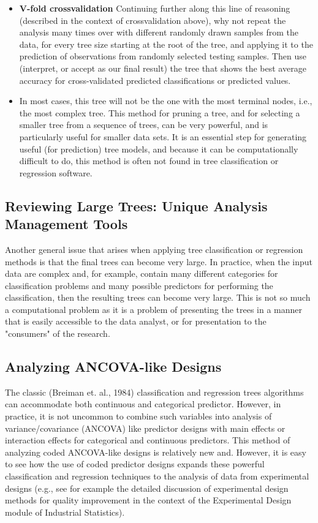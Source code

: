 \documentclass[caret-main.tex]{subfiles}
\begin{document}
\begin{itemize}
\item \textbf{V-fold crossvalidation} Continuing further along this line of reasoning (described in the context of crossvalidation above), why not repeat the analysis many times over with different randomly drawn samples from the data, for every tree size starting at the root of the tree, and applying it to the prediction of observations from randomly selected testing samples. Then use (interpret, or accept as our final result) the tree that shows the best average accuracy for cross-validated predicted classifications or predicted values.
\item In most cases, this tree will not be the one with the most terminal nodes, i.e., the most complex tree. This method for pruning a tree, and for selecting a smaller tree from a sequence of trees, can be very powerful, and is particularly useful for smaller data sets. It is an essential step for generating useful (for prediction) tree models, and because it can be computationally difficult to do, this method is often not found in tree classification or regression software.
\end{itemize}
\newpage
\subsection{Reviewing Large Trees: Unique Analysis Management Tools}

Another general issue that arises when applying tree classification or regression methods is that the final trees can become very large. In practice, when the input data are complex and, for example, contain many different categories for classification problems and many possible predictors for performing the classification, then the resulting trees can become very large. This is not so much a computational problem as it is a problem of presenting the trees in a manner that is easily accessible to the data analyst, or for presentation to the "consumers" of the research.

\subsection{Analyzing ANCOVA-like Designs}

The classic (Breiman et. al., 1984) classification and regression trees algorithms can accommodate both continuous and categorical predictor. However, in practice, it is not uncommon to combine such variables into analysis of variance/covariance (ANCOVA) like predictor designs with main effects or interaction effects for categorical and continuous predictors. This method of analyzing coded ANCOVA-like designs is relatively new and. However, it is easy to see how the use of coded predictor designs expands these powerful classification and regression techniques to the analysis of data from experimental designs (e.g., see for example the detailed discussion of experimental design methods for quality improvement in the context of the Experimental Design module of Industrial Statistics).
\end{document}
